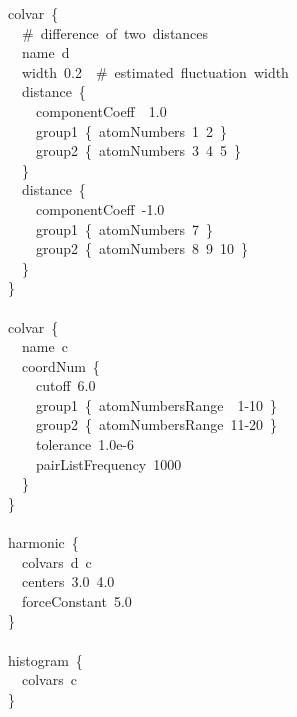 \begin{cvexampleinput}
colvar~\{\\
\-~~\#~difference~of~two~distances\\
\-~~name~d~\\
\-~~width~0.2~~\#~estimated~fluctuation~width~\\
\-~~distance~\{\\
\-~~~~componentCoeff~~1.0\\
\-~~~~group1~\{~atomNumbers~1~2~\}\\
\-~~~~group2~\{~atomNumbers~3~4~5~\}\\
\-~~\}\\
\-~~distance~\{\\
\-~~~~componentCoeff~-1.0\\
\-~~~~group1~\{~atomNumbers~7~\}\\
\-~~~~group2~\{~atomNumbers~8~9~10~\}\\
\-~~\}\\
\}\\
\\
colvar~\{\\
\-~~name~c\\
\-~~coordNum~\{\\
\-~~~~cutoff~6.0\\
\-~~~~group1~\{~atomNumbersRange~~1-10~\}\\
\-~~~~group2~\{~atomNumbersRange~11-20~\}\\
\-~~~~tolerance~1.0e-6\\
\-~~~~pairListFrequency~1000\\
\-~~\}\\
\}\\
\\
harmonic~\{\\
\-~~colvars~d~c\\
\-~~centers~3.0~4.0\\
\-~~forceConstant~5.0\\
\}\\
\\
histogram~\{\\
\-~~colvars~c\\
\}
\end{cvexampleinput}


